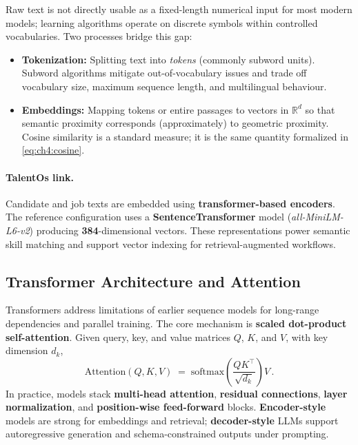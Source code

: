 Raw text is not directly usable as a fixed-length numerical input for most modern models; learning algorithms operate on discrete symbols within controlled vocabularies. Two processes bridge this gap:

\begin{itemize}
    \item \textbf{Tokenization:} Splitting text into \textit{tokens} (commonly subword units). Subword algorithms mitigate out-of-vocabulary issues and trade off vocabulary size, maximum sequence length, and multilingual behaviour.

    \item \textbf{Embeddings:} Mapping tokens or entire passages to vectors in $\mathbb{R}^{d}$ so that semantic proximity corresponds (approximately) to geometric proximity. Cosine similarity is a standard measure; it is the same quantity formalized in \autoref{eq:ch4:cosine}.
\end{itemize}

\paragraph{TalentOs link.}
Candidate and job texts are embedded using \textbf{transformer-based encoders}. The reference configuration uses a \textbf{SentenceTransformer} model (\textit{all-MiniLM-L6-v2}) producing \textbf{384}-dimensional vectors. These representations power semantic skill matching and support vector indexing for retrieval-augmented workflows.

\subsection{Transformer Architecture and Attention}
\label{sec:ch4:transformer_attention}

Transformers address limitations of earlier sequence models for long-range dependencies and parallel training. The core mechanism is \textbf{scaled dot-product self-attention}. Given query, key, and value matrices $Q$, $K$, and $V$, with key dimension $d_k$,
\begin{equation}
    \mathrm{Attention}(Q,K,V)
    \;=\;
    \mathrm{softmax}\!\left(\frac{QK^{\top}}{\sqrt{d_k}}\right)V\,.
    \label{eq:ch4:attention}
\end{equation}
In practice, models stack \textbf{multi-head attention}, \textbf{residual connections}, \textbf{layer normalization}, and \textbf{position-wise feed-forward} blocks. \textbf{Encoder-style} models are strong for embeddings and retrieval; \textbf{decoder-style} LLMs support autoregressive generation and schema-constrained outputs under prompting.


